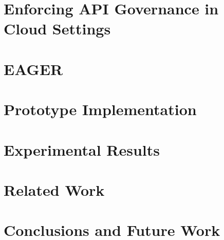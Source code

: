 

\section{Enforcing API Governance in Cloud Settings}
\label{sec:eager_enforce}




\section{EAGER}
\label{sec:eager_eager}


\section{Prototype Implementation}
\label{sec:eager_prototype_impl}


\section{Experimental Results}
\label{sec:eager_results}


\section{Related Work}
\label{sec:eager_related_work}


\section{Conclusions and Future Work}
\label{sec:eager_conc}

